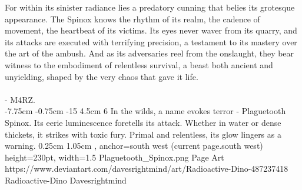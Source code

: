 For within its sinister radiance lies a predatory cunning that belies its grotesque appearance. The Spinox knows the rhythm of its realm, the cadence of movement, the heartbeat of its victims. Its eyes never waver from its quarry, and its attacks are executed with terrifying precision, a testament to its mastery over the art of the ambush. And as its adversaries reel from the onslaught, they bear witness to the embodiment of relentless survival, a beast both ancient and unyielding, shaped by the very chaos that gave it life.
\\\\- M4RZ.\\

{%
	{-7.75cm}%
	{-0.75cm}%
	{-15}%
	{4.5cm}%
	{6}%
	{%
		In the wilds, a name evokes terror - Plaguetooth Spinox. Its eerie luminescence foretells its attack. Whether in water or dense thickets, it strikes with toxic fury. Primal and relentless, its glow lingers as a warning. %
	}%
}%
{0.25cm}%
{1.05cm}%
{, anchor=south west}%
{(current page.south west)}%
{height=230pt, width=1.5\textwidth}%
{Plaguetooth_Spinox.png}%
	{Page \thepage}%
	{Art}%
	{https://www.deviantart.com/davesrightmind/art/Radioactive-Dino-487237418}%
	{Radioactive-Dino}%
	{Davesrightmind}%

